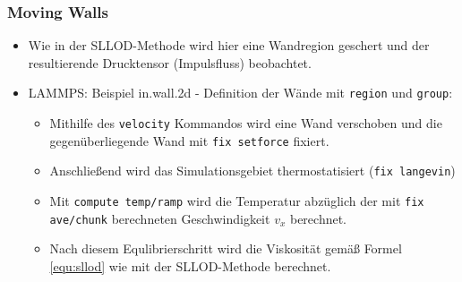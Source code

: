 \documentclass[a4paper, 10pt, 
               numbers=noenddot, toc=graduated,
               headsepline=true, footsepline=true,
               twoside=false, titlepage=true, 
               bibliography=totoc]{scrartcl}
\begin{document}
	\subsubsection{Moving Walls}
	    \begin{itemize}
		 	\item Wie in der SLLOD-Methode wird hier eine Wandregion geschert und der resultierende Drucktensor (Impulsfluss) beobachtet.
			\item LAMMPS: Beispiel in.wall.2d  - Definition der Wände mit \texttt{region} und \texttt{group}:
			\begin{itemize}
				\item Mithilfe des \texttt{velocity} Kommandos wird eine Wand verschoben und die gegenüberliegende Wand mit \texttt{fix setforce} fixiert.
				\item Anschließend wird das Simulationsgebiet thermostatisiert (\texttt{fix langevin})
				\item Mit \texttt{compute temp/ramp} wird die Temperatur abzüglich der mit \texttt{fix ave/chunk} berechneten Geschwindigkeit $v_x$ berechnet.
				\item Nach diesem Equlibrierschritt wird die Viskosität gemäß Formel \ref{equ:sllod} wie mit der SLLOD-Methode berechnet.
			\end{itemize}
		\end{itemize}
		
\end{document}
